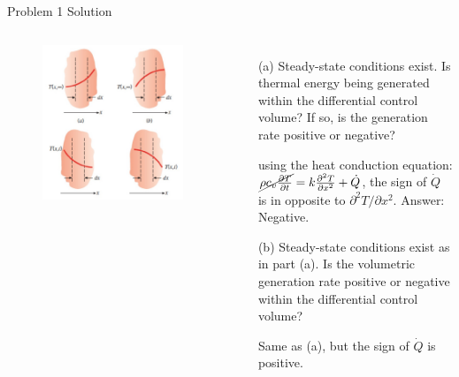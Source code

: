 \documentclass[9pt, aspectratio=169, handout]{beamer}
\begin{document}
\begin{frame}{Problem 1 Solution}
    \begin{columns}
        \begin{figure}
            \centering
            \includegraphics[width=\textwidth]{Figures/fig1.1.jpg}
        \end{figure}
        \begin{itemize}
            \item[(a)] Steady-state conditions exist. Is thermal energy being generated within the differential control volume? If so, is the generation rate positive or negative?\par\pause
             using the heat conduction equation: $\cancel{\rho c_v \frac{\partial T}{\partial t}} = k\frac{\partial^2 T}{\partial x^2} + \dot{Q}$, the sign of $\dot{Q}$ is in opposite to $\partial^2 T/\partial x^2$. Answer: Negative.\pause
            \item[(b)] Steady-state conditions exist as in part (a). Is the volumetric generation rate positive or negative within the differential control volume?\par\pause
             Same as (a), but the sign of $\dot{Q}$ is positive.\pause

\end{itemize}
\end{columns}
\end{frame}
\end{document}
